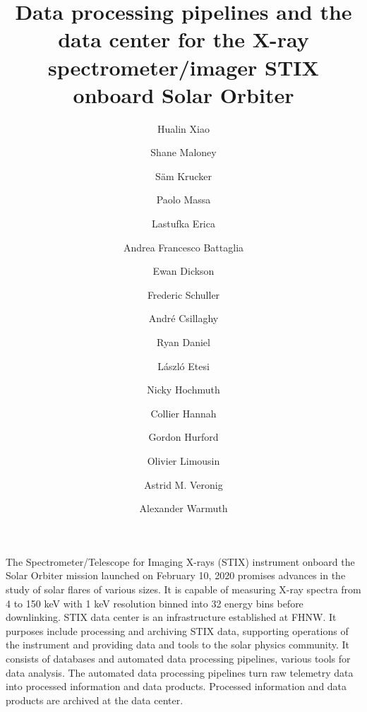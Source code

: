 \documentclass{aa}
\begin{document}
 


   \title{Data processing pipelines and the data center for the X-ray spectrometer/imager STIX onboard Solar Orbiter}

   \subtitle{}

   \author{Hualin Xiao
          \and 
          Shane Maloney 
          \and S\"am Krucker
          \and Paolo Massa 
          \and Lastufka Erica 
          \and Andrea Francesco Battaglia
          \and Ewan Dickson 
          \and Frederic Schuller 
          \and André Csillaghy 
          \and Ryan Daniel 
          \and László Etesi 
          \and Nicky Hochmuth 
          \and Collier Hannah 
          \and Gordon Hurford 
          \and Olivier Limousin 
          \and Astrid M. Veronig 
          \and Alexander Warmuth 
         }


   \date{}

 
  \abstract
   {} %
   { The Spectrometer/Telescope for Imaging X-rays (STIX) instrument onboard the Solar Orbiter mission launched on February 10,
    2020 promises advances in the study of solar flares of various sizes. 
    It is capable of measuring X-ray spectra from 4 to 150 keV with 1 keV resolution binned into 
    32 energy bins before downlinking. STIX data center is an infrastructure established at FHNW.
    It purposes include  processing and archiving STIX data, supporting 
    operations of the instrument and providing data and tools to the solar physics community.
    It consists of databases and automated data processing pipelines, various tools for data analysis. 
    The automated data processing pipelines turn raw telemetry data into processed information and data products. 
    Processed information and data products are archived at the data center.  
   }
\end{document}
